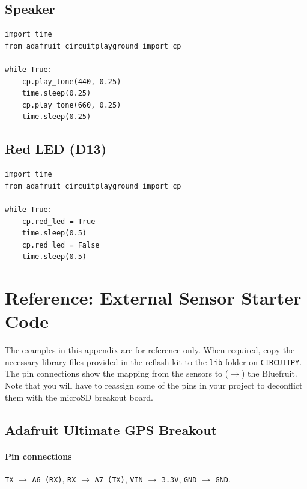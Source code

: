 \documentclass[11pt]{article}
\newcommand{\kit}[1]{\texttt{#1}}
\begin{document}
\subsection{Speaker}

\begin{lstlisting}
import time
from adafruit_circuitplayground import cp

while True:
    cp.play_tone(440, 0.25)
    time.sleep(0.25)
    cp.play_tone(660, 0.25)
    time.sleep(0.25)
\end{lstlisting}

\subsection{Red LED (D13)}


\begin{lstlisting}
import time
from adafruit_circuitplayground import cp

while True:
    cp.red_led = True
    time.sleep(0.5)
    cp.red_led = False
    time.sleep(0.5)
\end{lstlisting}
\newpage
\section{Reference: External Sensor Starter Code}\label{app:offboard}
The examples in this appendix are for reference only. When required, copy the necessary library files provided in the reflash kit to the \kit{lib} folder on \kit{CIRCUITPY}. The pin connections show the mapping from the sensors to ($\rightarrow$) the Bluefruit. Note that you will have to reassign some of the pins in your project to deconflict them with the microSD breakout board.

\subsection{Adafruit Ultimate GPS Breakout}
\paragraph{Pin connections} \texttt{TX} $\rightarrow$ \texttt{A6 (RX)}, \texttt{RX} $\rightarrow$ \texttt{A7 (TX)}, \texttt{VIN} $\rightarrow$ \texttt{3.3V}, \texttt{GND} $\rightarrow$ \texttt{GND}.
\end{document}
